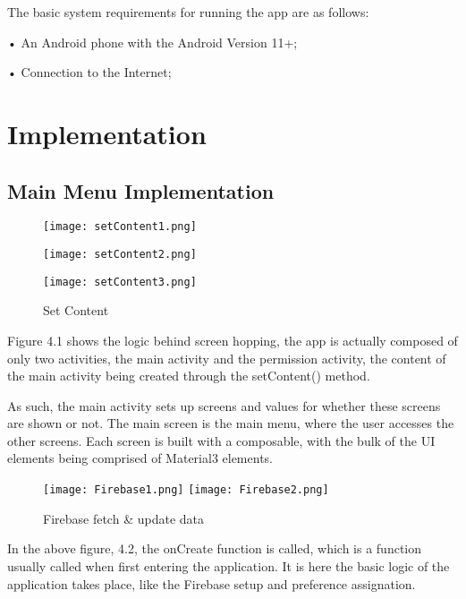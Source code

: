The basic system requirements for running the app are as follows:

    • An Android phone with the Android Version 11+;
    
    • Connection to the Internet;
\newpage
\section{Implementation}\label{sect:Implementation}

\subsection{Main Menu Implementation}\label{subsect:Main Menu Implementation}

\begin{figure}[htp]
    \centering
    \begin{minipage}{0.45\textwidth}
        \centering
        \texttt{[image: setContent1.png]}
    \end{minipage}\hfill
    \begin{minipage}{0.45\textwidth}
        \centering
        \texttt{[image: setContent2.png]}
    \end{minipage}
    \texttt{[image: setContent3.png]}
    \caption{Set Content}
    \label{fig: SetContent}
\end{figure}

Figure 4.1 shows the logic behind screen hopping, the app is actually composed of only two activities, the main activity and the permission activity, the content of the main activity being created through the setContent() method.

As such, the main activity sets up screens and values for whether these screens are shown or not. The main screen is the main menu, where the user accesses the other screens. Each screen is built with a composable, with the bulk of the \ac{UI} elements being comprised of Material3 elements.



\newpage
\begin{figure}[htp]
    \centering
    \texttt{[image: Firebase1.png]}
    \texttt{[image: Firebase2.png]}
    \caption{Firebase fetch \& update data}
    \label{fig: Firebase fetch & update data}
\end{figure}

In the above figure, 4.2, the onCreate function is called, which is a function usually called when first entering the application. It is here the basic logic of the application takes place, like the Firebase setup and preference assignation.

